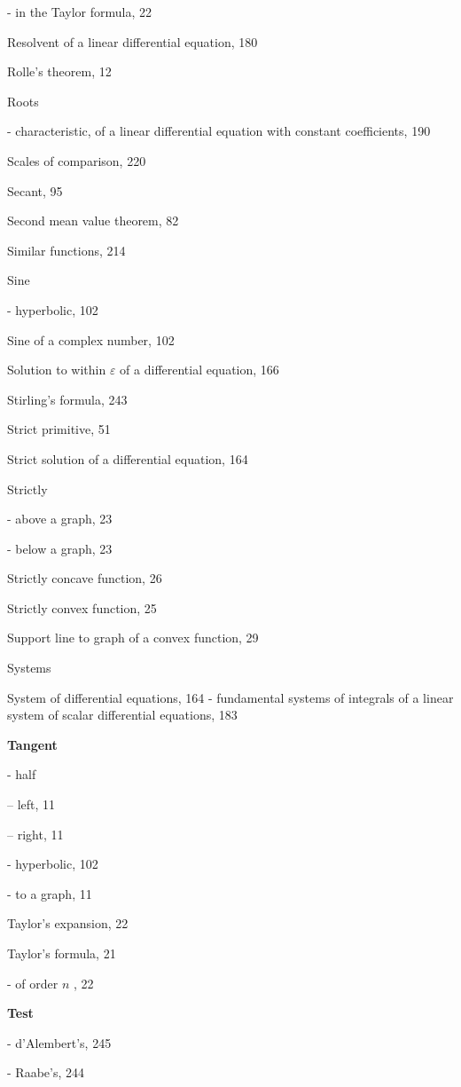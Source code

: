 - in the Taylor formula, 22

Resolvent of a linear differential equation, 180

Rolle's theorem, 12

Roots

- characteristic, of a linear differential equation with constant coefficients, 190

Scales of comparison, 220

Secant, 95

Second mean value theorem, 82

Similar functions, 214

Sine

- hyperbolic, 102

Sine of a complex number, 102

Solution to within \(\varepsilon\) of a differential equation, 166

Stirling's formula, 243

Strict primitive, 51

Strict solution of a differential equation, 164

Strictly

- above a graph, 23

- below a graph, 23

Strictly concave function, 26

Strictly convex function, 25

Support line to graph of a convex function, 29

Systems

System of differential equations, 164 - fundamental systems of integrals of a linear system of scalar differential equations, 183

\par\noindent\textbf{Tangent}\par

- half

-- left, 11

-- right, 11

- hyperbolic, 102

- to a graph, 11

Taylor's expansion, 22

Taylor's formula, 21

- of order \(n\) , 22

\par\noindent\textbf{Test}\par

- d'Alembert's, 245

- Raabe's, 244

